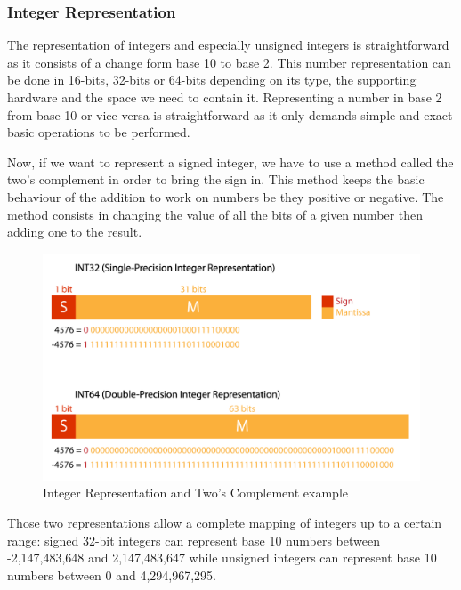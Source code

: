 \subsubsection{Integer Representation}

The representation of integers and especially unsigned integers is straightforward as it consists of a change form base 10 to base 2. This number representation can be done in 16-bits, 32-bits or 64-bits depending on its type, the supporting hardware and the space we need to contain it. Representing a number in base 2 from base 10 or vice versa is straightforward as it only demands simple and exact basic operations to be performed.

Now, if we want to represent a signed integer, we have to use a method called the two's complement in order to bring the sign in. This method keeps the basic behaviour of the addition to work on numbers be they positive or negative. The method consists in changing the value of all the bits of a given number then adding one to the result.

\begin{figure}[htbp]
	\centering
		\includegraphics[width=.8\textwidth]{Figures/IntegerRepr.png}
	\caption[Integer Representation]{Integer Representation and Two's Complement example}
	\label{fig:IntegerRepr}
\end{figure}

Those two representations allow a complete mapping of integers up to a certain range: signed 32-bit integers can represent base 10 numbers between -2,147,483,648 and 2,147,483,647 while unsigned integers can represent base 10 numbers between 0 and 4,294,967,295.

